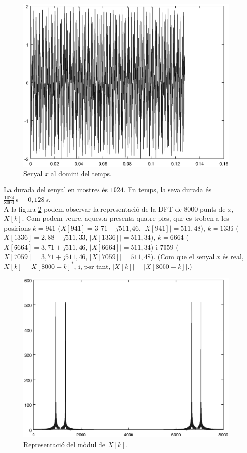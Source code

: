 \documentclass[11pt,a4]{article}
\numberwithin{equation}{section}
\theoremstyle{thmstyle}
\theoremstyle{thmstyle}
\theoremstyle{thmstyle}
\theoremstyle{thmstyle}
\theoremstyle{thmstyle}
\theoremstyle{thmstyle}
\theoremstyle{thmstyle}
\begin{document}
\begin{figure}
\includegraphics[scale=0.7]{senyalx.eps} 
\caption{Senyal $x$ al domini del temps.}
\label{fig:senyalx}
\end{figure}

La durada del senyal en mostres és $1024$. En temps, la seva durada és $\frac{1024}{8000}\,s=0,128\,s$.
\\

A la figura \ref{fig:moddft} podem observar la representació de la DFT de $8000$ punts de $x$, $X[k]$. Com podem veure, aquesta presenta quatre pics, que es troben a les posicions $k=941$ ($X[941] = 3,71-j511,46$, $\vert X[941]\vert=511,48$), $k=1336$ ($X[1336] = 2,88-j511,33$, $\vert X[1336]\vert=511,34$), $k=6664$ ($X[6664] = 3,71+j511,46$, $\vert X[6664]\vert=511,34$) i $7059$ ($X[7059] = 3,71+j511,46$, $\vert X[7059]\vert=511,48$). (Com que el senyal $x$ és real, $X[k] = X[8000-k]^\ast$, i, per tant, $\vert X[k]\vert = \vert X[8000-k]\vert$.)
\\

\begin{figure}
\includegraphics[scale=0.7]{moddft2.eps} 
\caption{Representació del mòdul de $X[k]$.}
\label{fig:moddft}
\end{figure}
\end{document}
